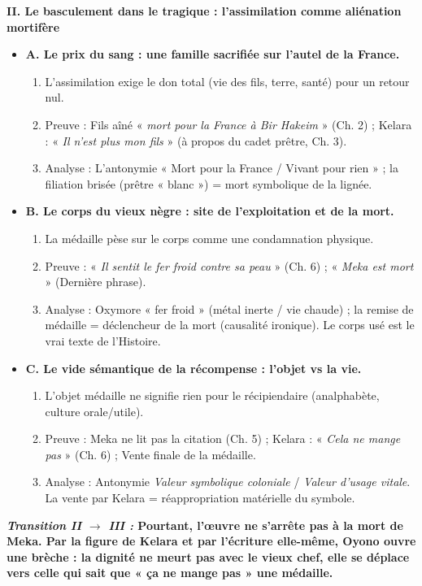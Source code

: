 \documentclass[11pt]{article}
\begin{document}
\begin{exoresolu}
\textbf{II. Le basculement dans le tragique : l'assimilation comme aliénation mortifère}
\begin{itemize}
    \item \textbf{A. Le prix du sang : une famille sacrifiée sur l'autel de la France.}
    \begin{enumerate}
        \item L'assimilation exige le don total (vie des fils, terre, santé) pour un retour nul.
        \item Preuve : Fils aîné « \emph{mort pour la France à Bir Hakeim} » (Ch. 2) ; Kelara : « \emph{Il n'est plus mon fils} » (à propos du cadet prêtre, Ch. 3).
        \item Analyse : L'antonymie « Mort pour la France / Vivant pour rien » ; la filiation brisée (prêtre « blanc ») = mort symbolique de la lignée.
    \end{enumerate}
    \item \textbf{B. Le corps du vieux nègre : site de l'exploitation et de la mort.}
    \begin{enumerate}
        \item La médaille pèse sur le corps comme une condamnation physique.
        \item Preuve : « \emph{Il sentit le fer froid contre sa peau} » (Ch. 6) ; « \emph{Meka est mort} » (Dernière phrase).
        \item Analyse : Oxymore « fer froid » (métal inerte / vie chaude) ; la remise de médaille = déclencheur de la mort (causalité ironique). Le corps usé est le vrai texte de l'Histoire.
    \end{enumerate}
    \item \textbf{C. Le vide sémantique de la récompense : l'objet vs la vie.}
    \begin{enumerate}
        \item L'objet médaille ne signifie rien pour le récipiendaire (analphabète, culture orale/utile).
        \item Preuve : Meka ne lit pas la citation (Ch. 5) ; Kelara : « \emph{Cela ne mange pas} » (Ch. 6) ; Vente finale de la médaille.
        \item Analyse : Antonymie \emph{Valeur symbolique coloniale} / \emph{Valeur d'usage vitale}. La vente par Kelara = réappropriation matérielle du symbole.
    \end{enumerate}
\end{itemize}

\textbf{\textit{Transition II $\to$ III :} Pourtant, l'œuvre ne s'arrête pas à la mort de Meka. Par la figure de Kelara et par l'écriture elle-même, Oyono ouvre une brèche : la dignité ne meurt pas avec le vieux chef, elle se déplace vers celle qui sait que « ça ne mange pas » une médaille.}


\end{exoresolu}
\end{document}
